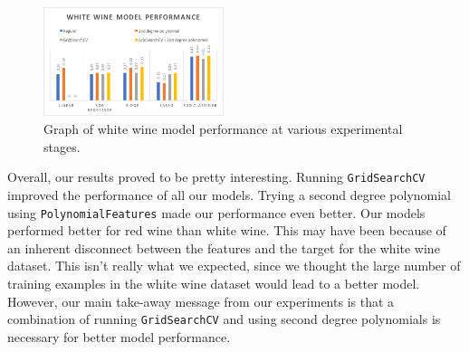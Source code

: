   \begin{figure}[htb]

  \centering  %

  \includegraphics[width=0.47\textwidth]{whitewine_score.png}

  \caption{Graph of white wine model performance at various experimental stages.}

  \label{fig:tex}

  \end{figure}
 

  

Overall, our results proved to be pretty interesting. Running \texttt{GridSearchCV} improved the performance of all our models. Trying a second degree polynomial using \texttt{PolynomialFeatures} made our performance even better. Our models performed better for red wine than white wine. This may have been because of an inherent disconnect between the features and the target for the white wine dataset. This isn't really what we expected, since we thought the large number of training examples in the white wine dataset would lead to a better model. However, our main take-away message from our experiments is that a combination of running \texttt{GridSearchCV} and using second degree polynomials is necessary for better model performance.